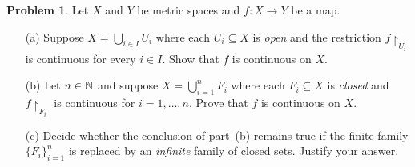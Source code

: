 \documentclass[12pt]{article}
\theoremstyle{definition} %
\newtheorem{problem}{Problem}
\theoremstyle{plain} %
\begin{document}
\begin{problem}
  Let $X$ and $Y$ be metric spaces and $f:X\to Y$ be a map.

  \begin{enumerate}
      \item[(a)]  Suppose $X=\bigcup_{i\in I}U_i$ where each $U_i\subseteq X$ is
      \emph{open} and the restriction $f\!\restriction_{U_i}$ is continuous for
      every $i\in I$.  
      Show that $f$ is continuous on $X$.

      \item[(b)]  Let $n\in\Bbb N$ and suppose
      $
          X=\bigcup_{i=1}^{n}F_i
      $
      where each $F_i\subseteq X$ is \emph{closed} and 
      $f\!\restriction_{F_i}$ is continuous for $i=1,\dots,n$.
      Prove that $f$ is continuous on $X$.

      \item[(c)]  Decide whether the conclusion of part~(b) remains true if
      the finite family $\{F_i\}_{i=1}^{n}$ is replaced by an \emph{infinite}
      family of closed sets.  Justify your answer.
  \end{enumerate}
\end{problem}
\end{document}
